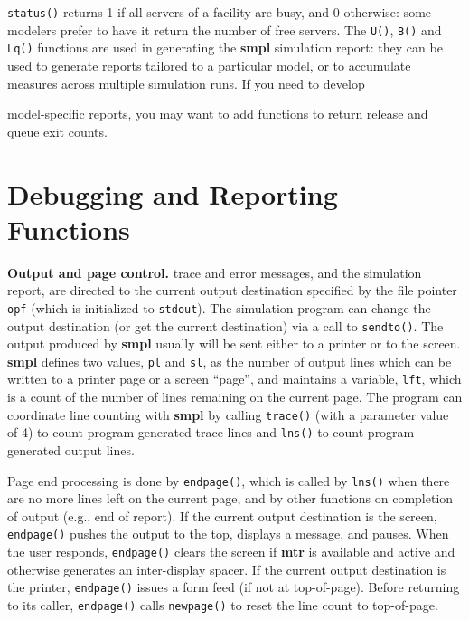 \texttt{status()} returns 1 if all servers of a facility are busy, and 0 otherwise:
some modelers prefer to have it return the number of free servers. The \texttt{U()},
\texttt{B()} and \texttt{Lq()} functions are used in generating the \textbf{smpl} simulation report:
they can be used to generate reports tailored to a particular model, or to
accumulate measures across multiple simulation runs. If you need to develop

\noindent model-specific reports, you may want to add functions to return release and
queue exit counts.

\section{Debugging and Reporting Functions}

\textbf{Output and page control.} trace and error messages, and the simulation
report, are directed to the current output destination specified by the file
pointer \texttt{opf} (which is initialized to \texttt{stdout}). The simulation program can
change the output destination (or get the current destination) via a call to
\texttt{sendto()}. The output produced by \textbf{smpl} usually will be sent either to a
printer or to the screen. \textbf{smpl} defines two values, \texttt{pl} and \texttt{sl}, as the number of
output lines which can be written to a printer page or a screen ``page'', and
maintains a variable, \texttt{lft}, which is a count of the number of lines remaining
on the current page. The program can coordinate line counting with \textbf{smpl} by
calling \texttt{trace()} (with a parameter value of 4) to count program-generated
trace lines and \texttt{lns()} to count program-generated output lines.

Page end processing is done by \texttt{endpage()}, which is called by \texttt{lns()}
when there are no more lines left on the current page, and by other functions
on completion of output (e.g., end of report). If the current output destination
is the screen, \texttt{endpage()} pushes the output to the top, displays a message,
and pauses. When the user responds, \texttt{endpage()} clears the screen if \textbf{mtr} is
available and active and otherwise generates an inter-display spacer. If
the current output destination is the printer, \texttt{endpage()} issues a form feed
(if not at top-of-page). Before returning to its caller, \texttt{endpage()} calls
\texttt{newpage()} to reset the line count to top-of-page.

